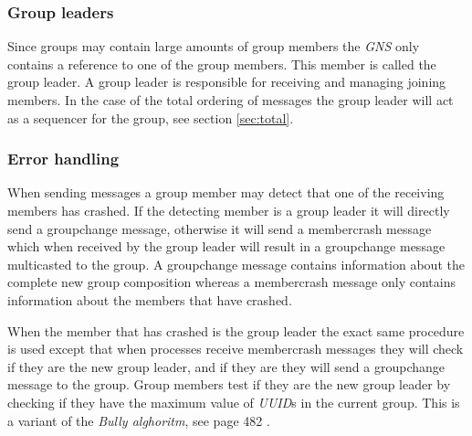 \documentclass[titlepage, twocolumn, a4paper, 10pt]{article}
\begin{document}
\subsubsection{Group leaders}\label{sec:group-leaders}
Since groups may contain large amounts of group members the
\textit{GNS} only contains a reference to one of the group members.
This member is called the group leader. A group leader is responsible
for receiving and managing joining members. In the case of the total
ordering of messages the group leader will act as a sequencer for the
group, see section \ref{sec:total}.

\subsubsection{Error handling}\label{sec:error-handling}
When sending messages a group member may detect that one of the
receiving members has crashed. If the detecting member is a group
leader it will directly send a groupchange message, otherwise it will
send a membercrash message which when received by the group leader
will result in a groupchange message multicasted to the group. A
groupchange message contains information about the complete new group
composition whereas a membercrash message only contains information
about the members that have crashed.

When the member that has crashed is the group leader the exact same procedure is used except that when processes receive membercrash messages they will check if they are the new group leader, and if they are they will send a groupchange message to the group. Group members test if they are the new group leader by checking if they have the maximum value of \textit{UUID}s in the current group. This is a variant of the \textit{Bully alghoritm}, see page 482 \cite{book:dist-syst}.

\end{document}
